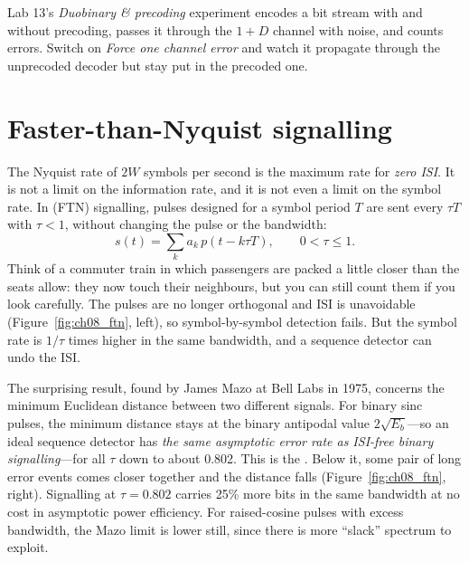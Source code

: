 \begin{tryit}
Lab 13's \emph{Duobinary \& precoding} experiment encodes a bit stream with and without precoding,
passes it through the $1+D$ channel with noise, and counts errors. Switch on \emph{Force one channel
error} and watch it
propagate through the unprecoded decoder but stay put in the precoded one.
\end{tryit}

\section{Faster-than-Nyquist signalling}
\label{sec:ch08:ftn}

The Nyquist rate of $2W$ symbols per second is the maximum rate for \emph{zero ISI}. It is not a
limit on the information rate, and it is not even a limit on the symbol rate. In
 (FTN) signalling, pulses designed for a symbol period $T$ are sent
every $\tau T$ with $\tau<1$, without changing the pulse or the bandwidth:
\begin{equation}
s(t)=\sum_k a_k\,p(t-k\tau T),\qquad 0<\tau\le1.
\end{equation}
Think of a commuter train in which passengers are packed a little closer than the seats allow:
they now touch their neighbours, but you can still count them if you look carefully. The
pulses are no longer orthogonal and ISI is unavoidable (Figure~\ref{fig:ch08_ftn}, left), so
symbol-by-symbol detection fails. But the symbol rate is $1/\tau$ times higher in the same
bandwidth, and a sequence detector can undo the ISI.


The surprising result, found by James Mazo at Bell Labs in 1975, concerns the minimum Euclidean
distance between two different signals. For binary sinc pulses, the minimum distance stays at
the binary antipodal value $2\sqrt{E_b}$---so an ideal sequence detector has \emph{the same
asymptotic error rate as ISI-free binary signalling}---for all $\tau$ down to about 0.802. This
is the . Below it, some pair of long error events comes closer together and the
distance falls (Figure~\ref{fig:ch08_ftn}, right). Signalling at $\tau=0.802$ carries 25\% more
bits in the same bandwidth at no cost in asymptotic power efficiency. For raised-cosine pulses
with excess bandwidth, the Mazo limit is lower still, since there is more ``slack'' spectrum to
exploit.

